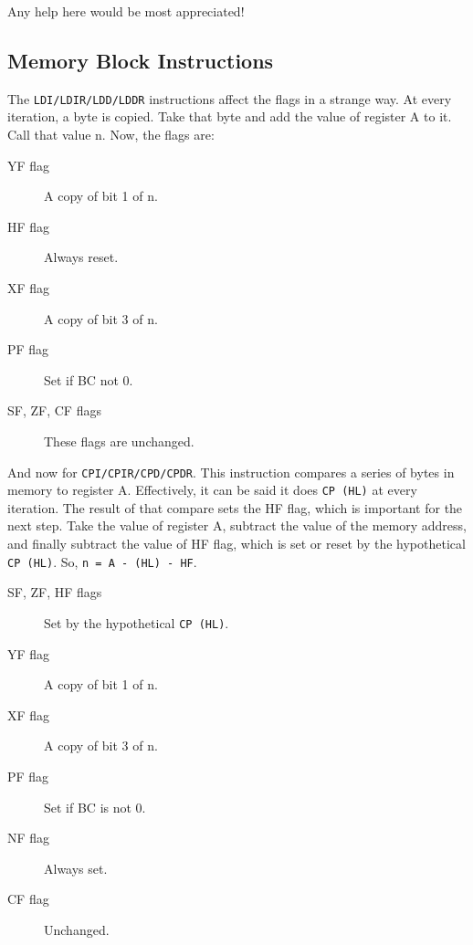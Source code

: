 \documentclass[12pt,twoside,openright,a4paper]{book}
\begin{document}
Any help here would be most appreciated!


\subsection{Memory Block Instructions \cite{mrison}}
\label{block_mem}

The {\tt LDI/LDIR/LDD/LDDR} instructions affect the flags in a strange way. At every iteration, a byte is copied. Take that byte and add the value of register A to it. Call that value n. Now, the flags are:

\begin{description}
 
	\item[YF flag]
	A copy of bit 1 of n.

	\item[HF flag]
	Always reset.

	\item[XF flag]
	A copy of bit 3 of n.

	\item[PF flag]
	Set if BC not 0.

	\item[SF, ZF, CF flags]
	These flags are unchanged.

\end{description}

And now for {\tt CPI/CPIR/CPD/CPDR}. This instruction compares a series of bytes in memory to register A. Effectively, it can be said it does {\tt CP (HL)} at every iteration. The result of that compare sets the HF flag, which is important for the next step. Take the value of register A, subtract the value of the memory address, and finally subtract the value of HF flag, which is set or reset by the hypothetical {\tt CP (HL)}. So, {\tt n = A - (HL) - HF}.

\begin{description}

	\item[SF, ZF, HF flags]
	Set by the hypothetical {\tt CP (HL)}.

	\item[YF flag]
	A copy of bit 1 of n.

	\item[XF flag]
	A copy of bit 3 of n.

	\item[PF flag]
	Set if BC is not 0.

	\item[NF flag]
	Always set.

	\item[CF flag]
	Unchanged.

\end{description}
\end{document}
